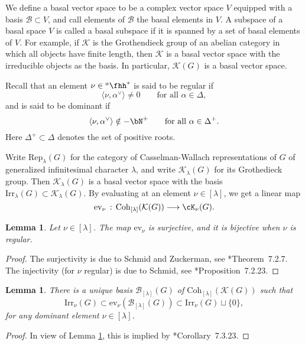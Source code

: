 \documentclass[12pt,a4paper]{amsart}
\newcommand{\CK}{{\mathcal {K}}}
\newcommand{\la}{\langle}
\newcommand{\ra}{\rangle}
\numberwithin{equation}{section}
\newtheorem{lem}[thm]{Lemma}
\theoremstyle{remark}
\def\Irr{\mathrm{Irr}}
\def\hha{{}^a\fhh}
\def\Coh{\mathrm{Coh}}
\newcommand{\Lam}{{[\lambda]}}
\newcommand{\Grt}{\cK}
\begin{document}
We define a basal vector space to be a complex vector space $V$ equipped with a basis $\mathcal B\subset V$, and call elements of $\mathcal B$ the basal elements in $V$. A subspace of a basal space $V$ is called a basal subspace if it is spanned by a set of basal elements of $V$. For example, if $\CK$ is the Grothendieck group of an abelian category in which all objects have finite length, then $\CK$ is a basal vector space with the irreducible objects as the basis. In particular, $\CK(G)$ is a basal vector space.


Recall that an element $\nu\in \hha^*$ is said to be regular if
\[
    \la \nu, \alpha^\vee\ra\neq 0 \qquad\textrm{for all $\alpha\in \Delta$},
  \]
  and is said to be dominant if
\[
    \la \nu, \alpha^\vee\ra\notin -\bN^+ \qquad\textrm{for all $\alpha\in \Delta^+$}.
  \]
Here $ \Delta^+\subset \Delta$ denotes the set of positive roots.


Write $\mathrm{Rep}_\lambda(G)$ for the category of Casselman-Wallach representations of $G$ of generalized infinitesimal character $\lambda$, and write   $\CK_{\lambda}(G)$ for its  Grothedieck group. Then   $\CK_{\lambda}(G)$  is a basal vector space with the basis $\Irr_\lambda(G)\subset \CK_{\lambda}(G)$.
By evaluating at an element  $\nu\in \Lam$, we get  a linear map
   \[
    \mathrm{ev}_{\nu } \, :\,  \Coh_{[\lambda]}(\CK(G)) \longrightarrow \Grt_{\nu}(G).
  \]



 \begin{lem}\label{lem21}
Let  $\nu\in \Lam$. The map  $\mathrm{ev}_{\nu}$ is surjective, and it is bijective when $\nu$ is regular.
     \end{lem}
\begin{proof}
The surjectivity is due to Schmid and Zuckerman, see  \cite{Vg}*{Theorem~7.2.7}. The injectivity (for $\nu$ regular)  is due to Schmid, see \cite{Vg}*{Proposition~7.2.23}.
\end{proof}




\begin{lem}\label{lemirr}
There is a unique basis $\mathcal B_\Lam(G)$ of  $\Coh_{[\lambda]}(\CK(G))$ such that
\[
  \Irr_\nu(G)\subset  \mathrm{ev}_{\nu }(\mathcal B_\Lam(G))\subset \Irr_\nu(G)\sqcup \{0\},
\]
 for any dominant element $\nu\in \Lam$.
          \end{lem}
\begin{proof}
In view  of Lemma \ref{lem21}, this is implied by  \cite{Vg}*{Corollary~7.3.23}.
\end{proof}
\end{document}
